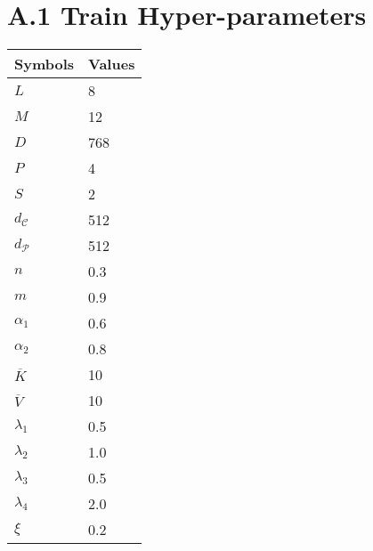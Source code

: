 \section*{A.1 Train Hyper-parameters}

\begin{table}[htbp]
\begin{center}
\begin{tabu} to 0.4\textwidth{X[3, l]X[3, l]}  
\toprule
Symbols & Values\\
\midrule
$L$ & 8 \\
$M$ & 12 \\
$D$ & 768 \\
$P$ & 4 \\
$S$ & 2 \\
$d_\mathcal{C}$ & 512 \\
$d_\mathcal{P}$ & 512 \\
$n$ & 0.3 \\
$m$ & 0.9 \\
$\alpha_1$ & 0.6 \\
$\alpha_2$ & 0.8 \\
$\overline{K}$ & 10 \\
$\overline{V}$ & 10 \\
$\lambda_1$ & 0.5 \\
$\lambda_2$ & 1.0 \\
$\lambda_3$ & 0.5 \\
$\lambda_4$ & 2.0 \\
$\xi$ & 0.2 \\
\bottomrule
\end{tabu}
\end{center}
\end{table}
